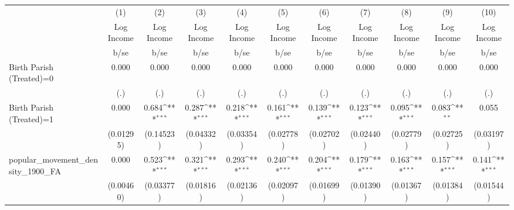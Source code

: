 {
\def\sym#1{\ifmmode^{#1}\else\(^{#1}\)\fi}
\begin{tabular}{l*{10}{c}}
\hline\hline
                    &\multicolumn{1}{c}{(1)}&\multicolumn{1}{c}{(2)}&\multicolumn{1}{c}{(3)}&\multicolumn{1}{c}{(4)}&\multicolumn{1}{c}{(5)}&\multicolumn{1}{c}{(6)}&\multicolumn{1}{c}{(7)}&\multicolumn{1}{c}{(8)}&\multicolumn{1}{c}{(9)}&\multicolumn{1}{c}{(10)}\\
                    &\multicolumn{1}{c}{Log Income}&\multicolumn{1}{c}{Log Income}&\multicolumn{1}{c}{Log Income}&\multicolumn{1}{c}{Log Income}&\multicolumn{1}{c}{Log Income}&\multicolumn{1}{c}{Log Income}&\multicolumn{1}{c}{Log Income}&\multicolumn{1}{c}{Log Income}&\multicolumn{1}{c}{Log Income}&\multicolumn{1}{c}{Log Income}\\
                    &        b/se         &        b/se         &        b/se         &        b/se         &        b/se         &        b/se         &        b/se         &        b/se         &        b/se         &        b/se         \\
\hline
Birth Parish (Treated)=0&       0.000         &       0.000         &       0.000         &       0.000         &       0.000         &       0.000         &       0.000         &       0.000         &       0.000         &       0.000         \\
                    &         (.)         &         (.)         &         (.)         &         (.)         &         (.)         &         (.)         &         (.)         &         (.)         &         (.)         &         (.)         \\
Birth Parish (Treated)=1&       0.000         &       0.684\sym{***}&       0.287\sym{***}&       0.218\sym{***}&       0.161\sym{***}&       0.139\sym{***}&       0.123\sym{***}&       0.095\sym{***}&       0.083\sym{**} &       0.055         \\
                    &   (0.01295)         &   (0.14523)         &   (0.04332)         &   (0.03354)         &   (0.02778)         &   (0.02702)         &   (0.02440)         &   (0.02779)         &   (0.02725)         &   (0.03197)         \\
popular\_movement\_density\_1900\_FA&       0.000         &       0.523\sym{***}&       0.321\sym{***}&       0.293\sym{***}&       0.240\sym{***}&       0.204\sym{***}&       0.179\sym{***}&       0.163\sym{***}&       0.157\sym{***}&       0.141\sym{***}\\
                    &   (0.00460)         &   (0.03377)         &   (0.01816)         &   (0.02136)         &   (0.02097)         &   (0.01699)         &   (0.01390)         &   (0.01367)         &   (0.01384)         &   (0.01544)         \\

\end{tabular}}
